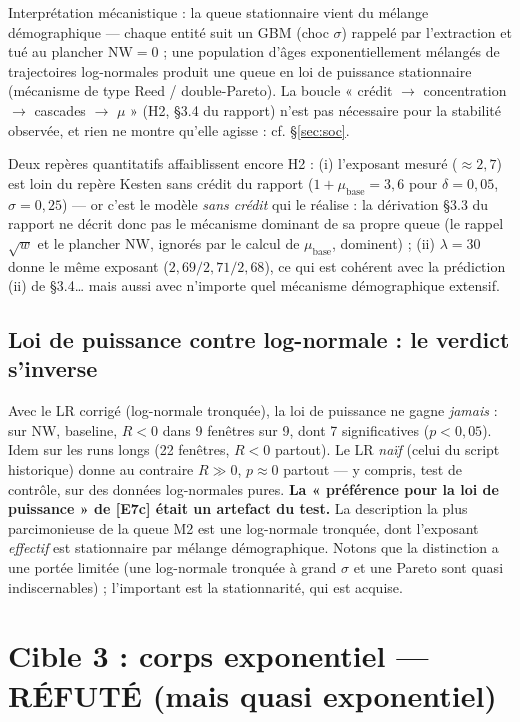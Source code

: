 \documentclass[11pt,a4paper]{article}
\newcommand{\NW}{\mathrm{NW}}
\begin{document}
Interprétation mécanistique : la queue stationnaire vient du mélange
démographique — chaque entité suit un GBM (choc $\sigma$) rappelé par
l'extraction et tué au plancher $\NW = 0$ ; une population d'âges
exponentiellement mélangés de trajectoires log-normales produit une queue en
loi de puissance stationnaire (mécanisme de type Reed / double-Pareto). La
boucle « crédit $\to$ concentration $\to$ cascades $\to$ $\mu$ » (H2, §3.4 du
rapport) n'est pas nécessaire pour la stabilité observée, et rien ne montre
qu'elle agisse : cf. \S\ref{sec:soc}.

Deux repères quantitatifs affaiblissent encore H2 : (i) l'exposant mesuré
($\approx 2{,}7$) est loin du repère Kesten sans crédit du rapport
($1 + \mu_{\mathrm{base}} = 3{,}6$ pour $\delta = 0{,}05$,
$\sigma = 0{,}25$) — or c'est le modèle \emph{sans crédit} qui le réalise :
la dérivation §3.3 du rapport ne décrit donc pas le mécanisme dominant de sa
propre queue (le rappel $\sqrt{w}$ et le plancher $\NW$, ignorés par le
calcul de $\mu_{\mathrm{base}}$, dominent) ; (ii) $\lambda = 30$ donne le
même exposant ($2{,}69/2{,}71/2{,}68$), ce qui est cohérent avec la
prédiction (ii) de §3.4… mais aussi avec n'importe quel mécanisme
démographique extensif.

\subsection{Loi de puissance contre log-normale : le verdict s'inverse}
Avec le LR corrigé (log-normale tronquée), la loi de puissance ne gagne
\emph{jamais} : sur $\NW$, baseline, $R < 0$ dans 9 fenêtres sur 9, dont 7
significatives ($p < 0{,}05$). Idem sur les runs longs (22 fenêtres, $R < 0$
partout). Le LR \emph{naïf} (celui du script historique) donne au contraire
$R \gg 0$, $p \approx 0$ partout — y compris, test de contrôle, sur des
données log-normales pures. \textbf{La « préférence pour la loi de
puissance » de [E7c] était un artefact du test.} La description la plus
parcimonieuse de la queue M2 est une log-normale tronquée, dont l'exposant
\emph{effectif} est stationnaire par mélange démographique. Notons que la
distinction a une portée limitée (une log-normale tronquée à grand $\sigma$
et une Pareto sont quasi indiscernables) ; l'important est la stationnarité,
qui est acquise.

\section{Cible 3 : corps exponentiel — RÉFUTÉ (mais quasi exponentiel)}
\label{sec:corps}
\end{document}
